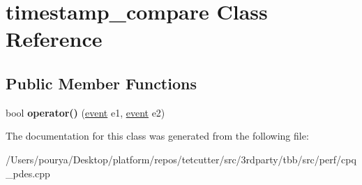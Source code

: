 \hypertarget{classtimestamp__compare}{}\section{timestamp\+\_\+compare Class Reference}
\label{classtimestamp__compare}
\subsection*{Public Member Functions}
\begin{DoxyCompactItemize}
\item 
\hypertarget{classtimestamp__compare_a28690f47be14629afe05a4effba9fff2}{}bool {\bfseries operator()} (\hyperlink{classevent}{event} e1, \hyperlink{classevent}{event} e2)\label{classtimestamp__compare_a28690f47be14629afe05a4effba9fff2}

\end{DoxyCompactItemize}


The documentation for this class was generated from the following file\+:\begin{DoxyCompactItemize}
\item 
/\+Users/pourya/\+Desktop/platform/repos/tetcutter/src/3rdparty/tbb/src/perf/cpq\+\_\+pdes.\+cpp\end{DoxyCompactItemize}
